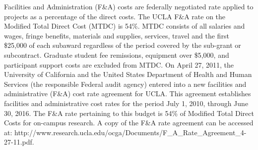 \documentclass[11pt]{article}
\begin{document}
Facilities and Administration (F\&A) costs are federally negotiated
rate applied to projects as a percentage of the direct costs.  The
UCLA F\&A rate on the Modified Total Direct Cost (MTDC) is 54\%.  MTDC
consists of all salaries and wages, fringe benefits, materials and
supplies, services, travel and the first \$25,000 of each subaward
regardless of the period covered by the sub-grant or subcontract.
Graduate student fee remissions, equipment over \$5,000, and
participant support costs are excluded from MTDC.  On April 27, 2011,
the University of California and the United States Department of
Health and Human Services (the responsible Federal audit agency)
entered into a new facilities and administrative (F\&A) cost rate
agreement for UCLA. This agreement establishes facilities and
administrative cost rates for the period July 1, 2010, through June
30, 2016.  The F\&A rate pertaining to this budget is 54\% of Modified
Total Direct Costs for on-campus research.  A copy of the F\&A rate
agreement can be accessed at: {\ttfamily
  http://www.research.ucla.edu/ocga/Documents/F\_A\_Rate\_Agreement\_4-27-11.pdf}.
\end{document}
